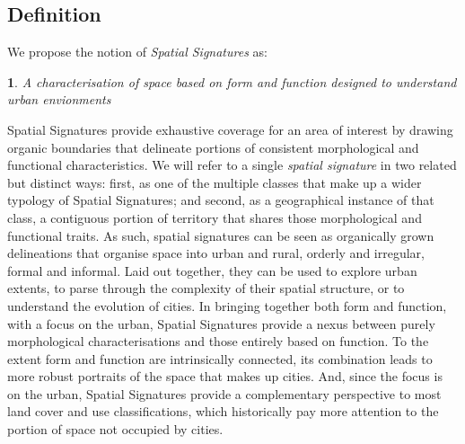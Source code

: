 \subsection{Definition}
\label{sec:ss_def}

We propose the notion of \textit{Spatial Signatures} as:

\newtheorem*{theorem}{}
\begin{theorem}
A characterisation of space based on form and function designed to understand
urban envionments
\end{theorem}

Spatial Signatures provide exhaustive coverage for an area of interest by
drawing organic boundaries that delineate portions of consistent morphological
and functional characteristics.
%
We will refer to a single \textit{spatial signature} in two related but
distinct ways: first, as one of the multiple classes that make up a wider
typology of Spatial Signatures; and second, as a geographical instance of that
class, a contiguous portion of territory that shares those morphological and
functional traits.
As such, spatial signatures can be seen as organically grown delineations that
organise space into urban and rural, orderly and irregular, formal and informal.
%
Laid out together, they can be used to explore urban extents, to parse through
the complexity of their spatial structure, or to understand the evolution of
cities.
In bringing together both form and function, with a focus on the urban,
Spatial Signatures provide a nexus between purely morphological
characterisations and those entirely based on function.
%
To the extent form and function are intrinsically connected, its
combination leads to more robust portraits of the space that makes up cities.
And, since the focus is on the urban, Spatial Signatures provide a complementary
perspective to most land cover and use classifications, which historically
pay more attention to the portion of space not occupied by cities.

